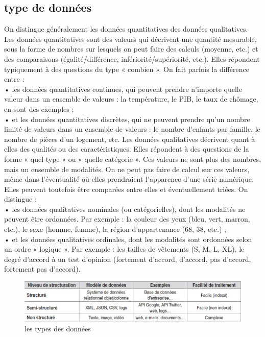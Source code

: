 \documentclass[11pt]{report}
\begin{document}
\subsection{type de données}
On distingue généralement les données quantitatives des données qualitatives.\\
Les données quantitatives sont des valeurs qui décrivent une quantité mesurable, sous la
forme de nombres sur lesquels on peut faire des calculs (moyenne, etc.) et des
comparaisons (égalité/différence, infériorité/supériorité, etc.). Elles répondent typiquement
à des questions du type « combien ». On fait parfois la différence entre :\\
• les données quantitatives continues, qui peuvent prendre n’importe quelle valeur dans un
ensemble de valeurs : la température, le PIB, le taux de chômage, en sont des exemples ;\\
• et les données quantitatives discrètes, qui ne peuvent prendre qu’un nombre limité de
valeurs dans un ensemble de valeurs : le nombre d’enfants par famille, le nombre de
pièces d’un logement, etc.
Les données qualitatives décrivent quant à elles des qualités ou des caractéristiques. Elles
répondent à des questions de la forme « quel type » ou « quelle catégorie ». Ces valeurs ne
sont plus des nombres, mais un ensemble de modalités. On ne peut pas faire de calcul sur
ces valeurs, même dans l’éventualité où elles prendraient l’apparence d’une série
numérique. Elles peuvent toutefois être comparées entre elles et éventuellement triées. On
distingue :\\
• les données qualitatives nominales (ou catégorielles), dont les modalités ne peuvent être
ordonnées. Par exemple : la couleur des yeux (bleu, vert, marron, etc.), le sexe (homme,
femme), la région d’appartenance (68, 38, etc.) ;\\
• et les données qualitatives ordinales, dont les modalités sont ordonnées selon un ordre
« logique ». Par exemple : les tailles de vêtements (S, M, L, XL), le degré d’accord à un
test d’opinion (fortement d’accord, d’accord, pas d’accord, fortement pas d’accord).
\begin{figure}[H]
	\begin{center}
		\includegraphics[width=12cm]{images/data_type.png}
		\caption{les types des données}
		\label{fig:figure}
	\end{center}
\end{figure}
\end{document}
